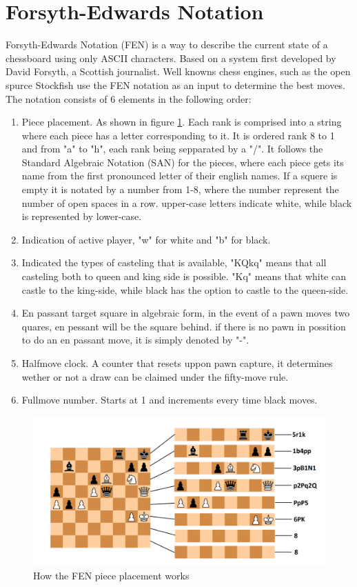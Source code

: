 \newpage
\section{Forsyth-Edwards Notation}
Forsyth-Edwards Notation (FEN) is a way to describe the current state of a chessboard using only ASCII characters. Based on a system first developed by David Forsyth, a Scottish journalist. Well knowns chess engines, such as the open spurce Stockfish use the FEN notation as an input to determine the best moves.\\

The notation consists of 6 elements in the following order:\cite{wiki:FEN}
\begin{enumerate}
    \item Piece placement. As shown in figure \ref{fig:03:FEN_workings}. Each rank is comprised into a string  where each piece has a letter corresponding to it. It is ordered rank 8 to 1 and from "a" to "h", each rank being sepparated by a "/". It follows the Standard Algebraic Notation (SAN) for the pieces, where each piece gets its name from the first pronounced letter of their english names. If a squere is empty it is notated by a number from 1-8, where the number represent the number of open spaces in a row. upper-case letters indicate white, while black is represented by lower-case. 
    \item Indication of active player, "w" for white and "b" for black.
    \item Indicated the types of casteling that is available, "KQkq" means that all casteling both to queen and king side is possible. "Kq" means that white can castle to the king-side, while black has the option to castle to the queen-side.
    \item En passant target square in algebraic form, in the event of a pawn moves two quares, en pessant will be the square behind. if there is no pawn in possition to do an en passant move, it is simply denoted by "-".
    \item Halfmove clock. A counter that resets uppon pawn capture, it determines wether or not a draw can be claimed under the fifty-move rule.
    \item Fullmove number. Starts at 1 and increments every time black moves.
\end{enumerate}

\begin{figure}[H]
    \centering
    \includegraphics[width=\textwidth]{03_Theory/figures/FEN_explain.png}
    \caption{How the FEN piece placement works}
    \label{fig:03:FEN_workings}
\end{figure}